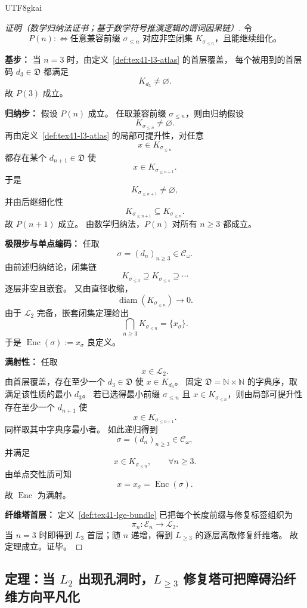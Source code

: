 \documentclass[12pt]{article}
\newcommand{\NN}{\mathbb{N}}
\newcommand{\Ltwo}{\mathcal{L}_2}
\newcommand{\Dpair}{\mathfrak D}
\newcommand{\CodeSpace}{\mathcal{C}_\omega}
\newcommand{\Enc}{\operatorname{Enc}}
\newcommand{\diam}{\operatorname{diam}}
\begin{document}
\begin{CJK*}{UTF8}{gkai}
\begin{proof}[证明（数学归纳法证书；基于数学符号推演逻辑的谓词因果链）]
令
\[
  P(n)
  :
  \Longleftrightarrow
  \text{任意兼容前缀 }\sigma_{\le n}\text{ 对应非空闭集 }K_{\sigma_{\le n}}
  \text{，且能继续细化。}
\]

\textbf{基步：}
当 $n=3$ 时，由定义~\ref{def:tex41-l3-atlas} 的首层覆盖，
每个被用到的首层码 $d_3\in\Dpair$ 都满足
\[
  K_{d_3}\neq\varnothing.
\]
故 $P(3)$ 成立。

\textbf{归纳步：}
假设 $P(n)$ 成立。
任取兼容前缀 $\sigma_{\le n}$，则由归纳假设
\[
  K_{\sigma_{\le n}}\neq\varnothing.
\]
再由定义~\ref{def:tex41-l3-atlas} 的局部可提升性，对任意
\[
  x\in K_{\sigma_{\le n}}
\]
都存在某个 $d_{n+1}\in\Dpair$ 使
\[
  x\in K_{\sigma_{\le n+1}}.
\]
于是
\[
  K_{\sigma_{\le n+1}}\neq\varnothing,
\]
并由后继细化性
\[
  K_{\sigma_{\le n+1}}\subseteq K_{\sigma_{\le n}}.
\]
故 $P(n+1)$ 成立。
由数学归纳法，$P(n)$ 对所有 $n\ge 3$ 都成立。

\textbf{极限步与单点编码：}
任取
\[
  \sigma=(d_n)_{n\ge 3}\in\CodeSpace.
\]
由前述归纳结论，闭集链
\[
  K_{\sigma_{\le 3}}\supseteq K_{\sigma_{\le 4}}\supseteq\cdots
\]
逐层非空且嵌套。
又由直径收缩，
\[
  \diam(K_{\sigma_{\le n}})\to 0.
\]
由于 $\Ltwo$ 完备，嵌套闭集定理给出
\[
  \bigcap_{n\ge 3}K_{\sigma_{\le n}}=\{x_\sigma\}.
\]
于是 $\Enc(\sigma):=x_\sigma$ 良定义。

\textbf{满射性：}
任取
\[
  x\in\Ltwo.
\]
由首层覆盖，存在至少一个 $d_3\in\Dpair$ 使 $x\in K_{d_3}$。
固定 $\Dpair=\NN\times\NN$ 的字典序，取满足该性质的最小 $d_3$。
若已选得最小前缀 $\sigma_{\le n}$ 且 $x\in K_{\sigma_{\le n}}$，则由局部可提升性存在至少一个 $d_{n+1}$ 使
\[
  x\in K_{\sigma_{\le n+1}}.
\]
同样取其中字典序最小者。
如此递归得到
\[
  \sigma=(d_n)_{n\ge 3}\in\CodeSpace,
\]
并满足
\[
  x\in K_{\sigma_{\le n}},\qquad \forall n\ge 3.
\]
由单点交性质可知
\[
  x=x_\sigma=\Enc(\sigma).
\]
故 $\Enc$ 为满射。

\textbf{纤维塔首层：}
定义~\ref{def:tex41-lge-bundle} 已把每个长度前缀与修复标签组织为
\[
  \pi_n:\mathcal E_n\to\Ltwo.
\]
当 $n=3$ 时即得到 $L_3$ 首层；随 $n$ 递增，得到 $L_{\ge 3}$ 的逐层离散修复纤维塔。
故定理成立。证毕。
\end{proof}

\subsection{定理：当 $L_2$ 出现孔洞时，$L_{\ge 3}$ 修复塔可把障碍沿纤维方向平凡化}
\label{subsec:tex41-ch1-theorem}


\end{CJK*}
\end{document}
